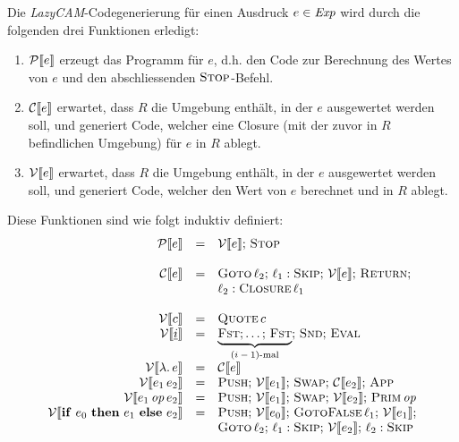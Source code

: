 \documentclass[12pt,fleqn]{article}
\begin{document}
Die {\em LazyCAM}-Codegenerierung f\"ur einen Ausdruck $e\in{\text{\it Exp\/}}$ wird durch die folgenden drei Funktionen erledigt:
\begin{enumerate}
\item $\mathcal{P}\llbracket e \rrbracket$ erzeugt das Programm f\"ur $e$, d.h. den Code zur Berechnung des Wertes von $e$ und
  den abschliessenden $\textsc{Stop}$-Befehl.
\item $\mathcal{C}\llbracket e \rrbracket$ erwartet, dass $R$ die Umgebung enth\"alt, in der $e$ ausgewertet werden soll, und
  generiert Code, welcher eine Closure (mit der zuvor in $R$ befindlichen Umgebung) f\"ur $e$ in $R$ ablegt.
\item $\mathcal{V}\llbracket e \rrbracket$ erwartet, dass $R$ die Umgebung enth\"alt, in der $e$ ausgewertet werden soll, und
  generiert Code, welcher den Wert von $e$ berechnet und in $R$ ablegt.
\end{enumerate}
Diese Funktionen sind wie folgt induktiv definiert:
\[\begin{array}{rcl}
  \mathcal{P}\llbracket e \rrbracket &=& \mathcal{V}\llbracket e \rrbracket;\,\textsc{Stop} \\
  \\
  \mathcal{C}\llbracket e \rrbracket &=& \textsc{Goto}\,\ell_2;\,\ell_1:\textsc{Skip};\,
                         \mathcal{V}\llbracket e \rrbracket;\,\textsc{Return}; \\
                      && \ell_2:\textsc{Closure}\,\ell_1 \\
  \\
  \mathcal{V}\llbracket c \rrbracket &=& \textsc{Quote}\,c \\
  \mathcal{V}\llbracket \underline{i} \rrbracket &=& \underbrace{\textsc{Fst};\ldots;\,\textsc{Fst}}_{\text{$(i-1)$-mal}};\,
                                     \textsc{Snd};\,\textsc{Eval} \\
  \mathcal{V}\llbracket \lambda .\,e \rrbracket &=& \mathcal{C}\llbracket e \rrbracket \\
  \mathcal{V}\llbracket e_1\,e_2 \rrbracket &=& \textsc{Push};\,\mathcal{V}\llbracket e_1 \rrbracket;\,\textsc{Swap};\,
                                      \mathcal{C}\llbracket e_2 \rrbracket;\,\textsc{App} \\
  \mathcal{V}\llbracket e_1\,{\text{\it op\/}}\,e_2 \rrbracket &=& \textsc{Push};\,\mathcal{V}\llbracket e_1 \rrbracket;\,\textsc{Swap};\,
                                     \mathcal{V}\llbracket e_2 \rrbracket;\,\textsc{Prim}\,{\text{\it op\/}} \\
  \mathcal{V}\llbracket \mathbf{if}\ e_0\ \mathbf{then}\ e_1\ \mathbf{else}\ e_2 \rrbracket &=& \textsc{Push};\,\mathcal{V}\llbracket e_0 \rrbracket;\,\textsc{GotoFalse}\,\ell_1;\,
                                             \mathcal{V}\llbracket e_1 \rrbracket; \\
                                         &&  \textsc{Goto}\,\ell_2;\,\ell_1:\textsc{Skip};\,
                                             \mathcal{V}\llbracket e_2 \rrbracket;\,\ell_2:\textsc{Skip}
\end{array}\]
\end{document}
